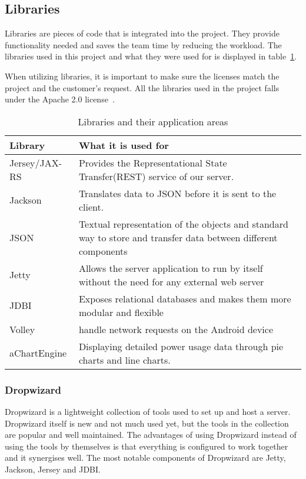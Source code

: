 \subsection{Libraries}
\label{sec:libraries}
Libraries are pieces of code that is integrated into the project. They provide functionality needed and saves the team time by reducing the workload. The libraries used in this project and what they were used for is displayed in table~\ref{tab:libs}.

When utilizing libraries, it is important to make sure the licenses match the project and the customer's request. All the libraries used in the project falls under the Apache 2.0 license~\cite{Apache}.

\begin{table}[H]
\begin{tabular}{|l|p{12.9cm}|}
\hline
\textbf{Library }& \textbf{What it is used for}\\\hline
Jersey/JAX-RS & Provides the Representational State Transfer(REST) service of our server.\\\hline
Jackson&Translates data to JSON before it is sent to the client.\\\hline
JSON&Textual representation of the objects and standard way to store and transfer data between different components\\\hline
Jetty&Allows the server application to run by itself without the need for any external web server\\\hline
JDBI&Exposes relational databases and makes them more modular and flexible\\\hline
Volley & handle network requests on the Android device\\\hline
aChartEngine& Displaying detailed power usage data through  pie charts and line charts.\\\hline
\end{tabular}
\caption{Libraries and their application areas}
\label{tab:libs}
\end{table}

\subsubsection{Dropwizard}
Dropwizard is a lightweight collection of tools used to set up and host a server. Dropwizard itself is new and not much used yet, but the tools in the collection are popular and well maintained. 
The advantages of using Dropwizard instead of using the tools by themselves is that everything is configured to work together and it synergises well. The most notable components of Dropwizard are Jetty, Jackson, Jersey and JDBI.



